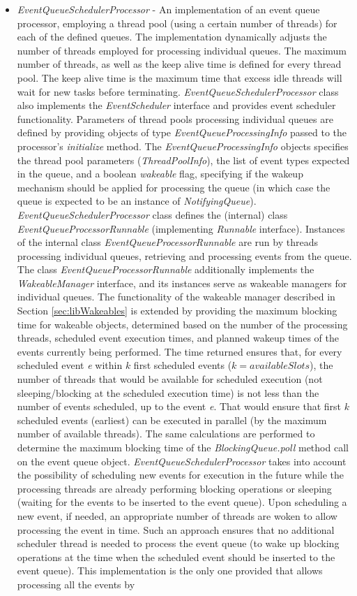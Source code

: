 \begin{itemize}
	\item \emph{EventQueueSchedulerProcessor} - An implementation of an event queue processor, employing a thread pool (using a certain number of threads) for each of the defined queues. The implementation dynamically adjusts the number of threads employed for processing individual queues. The maximum number of threads, as well as the keep alive time is defined for every thread pool. The keep alive time is the maximum time that excess idle threads will wait for new tasks before terminating. \emph{EventQueueSchedulerProcessor} class also implements the \emph{EventScheduler} interface and provides event scheduler functionality. Parameters of thread pools processing individual queues are defined by providing objects of type \emph{EventQueueProcessingInfo} passed to the processor's \emph{initialize} method. The \emph{EventQueueProcessingInfo} objects specifies the thread pool parameters (\emph{ThreadPoolInfo}), the list of event types expected in the queue, and a boolean \emph{wakeable} flag, specifying if the wakeup mechanism should be applied for processing the queue (in which case the queue is expected to be an instance of \emph{NotifyingQueue}). \emph{EventQueueSchedulerProcessor} class defines the (internal) class \emph{EventQueueProcessorRunnable} (implementing \emph{Runnable} interface). Instances of the internal class \emph{EventQueueProcessorRunnable} are run by threads processing individual queues, retrieving and processing events from the queue. The class \emph{EventQueueProcessorRunnable} additionally implements the \emph{WakeableManager} interface, and its instances serve as wakeable managers for individual queues. The functionality of the wakeable manager described in Section \ref{sec:libWakeables} is extended by providing the maximum blocking time for wakeable objects, determined based on the number of the processing threads, scheduled event execution times, and planned wakeup times of the events currently being performed. The time returned ensures that, for every scheduled event \emph{e} within $k$ first scheduled events ($k = availableSlots$), the number of threads that would be available for scheduled execution (not sleeping/blocking at the scheduled execution time) is not less than the number of events scheduled, up to the event \emph{e}. That would ensure that first $k$ scheduled events (earliest) can be executed in parallel (by the maximum number of available threads). The same calculations are performed to determine the maximum blocking time of the \emph{BlockingQueue.poll} method call on the event queue object. \emph{EventQueueSchedulerProcessor} takes into account the possibility of scheduling new events for execution in the future while the processing threads are already performing blocking operations or sleeping (waiting for the events to be inserted to the event queue). Upon scheduling a new event, if needed, an appropriate number of threads are woken to allow processing the event in time. Such an approach ensures that no additional scheduler thread is needed to process the event queue (to wake up blocking operations at the time when the scheduled event should be inserted to the event queue). This implementation is the only one provided that allows processing all the events by 
\end{itemize}
